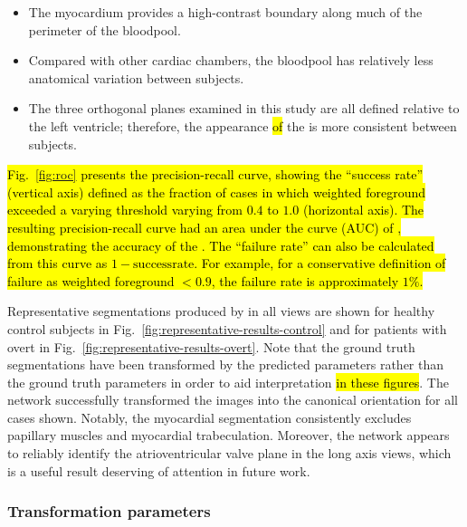 \begin{itemize}
\item The \LV{} myocardium provides a high-contrast boundary along much of the perimeter of the \LV{} bloodpool.
\item Compared with other cardiac chambers, the \LV{} bloodpool has relatively less anatomical variation between subjects.
\item The three orthogonal planes examined in this study are all defined relative to the left ventricle; therefore, the appearance \hl{of} the \LV{} is more consistent between subjects.
\end{itemize}

\hl{
Fig.~\ref{fig:roc} presents the precision-recall curve, showing the ``success rate'' (vertical axis) defined as the fraction of cases in which weighted foreground \IoU{} exceeded a varying threshold varying from $0.4$ to $1.0$ (horizontal axis).
The resulting precision-recall curve had an area under the curve (AUC) of \AUC{}, demonstrating the accuracy of the \omeganet{}.
The ``failure rate'' can also be calculated from this curve as $1 - \mathrm{success rate}$.
For example, for a conservative definition of failure as weighted foreground \IoU{} $< 0.9$, the failure rate is approximately $1\%$.
}

Representative segmentations produced by \bestnetwork{} in all views are shown for healthy control subjects in Fig.~\ref{fig:representative-results-control} and for patients with overt \HCM{} in Fig.~\ref{fig:representative-results-overt}.
Note that the ground truth segmentations have been transformed by the predicted parameters rather than the ground truth parameters in order to aid interpretation \hl{in these figures}.
The network successfully transformed the images into the canonical orientation for all cases shown.
Notably, the myocardial segmentation consistently excludes papillary muscles and myocardial trabeculation.
Moreover, the network appears to reliably identify the atrioventricular valve plane in the long axis views, which is a useful result deserving of attention in future work.





\subsubsection{Transformation parameters}



